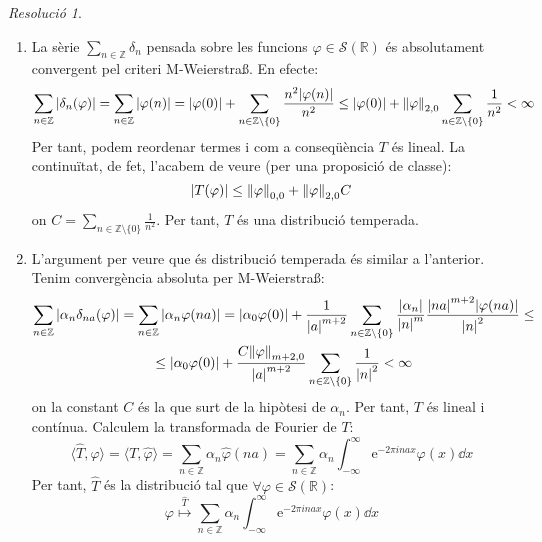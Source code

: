 \documentclass[10pt,a4paper]{article}
\newcommand{\ZZ}{\ensuremath{\mathbb{Z}}} %
\newcommand{\RR}{\ensuremath{\mathbb{R}}} %
\theoremstyle{definition}
\theoremstyle{remark}
\newtheorem*{res}{Resolució}
\renewcommand{\exp}[1]{\mathrm{e}^{#1}} %
\begin{document}
\begin{res}\hfill
  \begin{enumerate}
    \item La sèrie $\sum_{n\in\ZZ}\delta_n$ pensada sobre les funcions $\varphi\in\mathcal{S}(\RR)$ és absolutament convergent pel criteri M-Weierstra\ss. En efecte:
          $$
            \sum_{n\in\ZZ}\abs{\delta_n(\varphi)}=\sum_{n\in\ZZ}\abs{\varphi(n)}=\abs{\varphi(0)}+\sum_{n\in\ZZ\setminus\{0\}}\frac{n^2\abs{\varphi(n)}}{n^2}\leq \abs{\varphi(0)}+\norm{\varphi}_{2,0}\sum_{n\in\ZZ\setminus\{0\}}\frac{1}{n^2}<\infty
          $$
          Per tant, podem reordenar termes i com a conseqüència $T$ és lineal. La continuïtat, de fet, l'acabem de veure (per una proposició de classe):
          $$
            \abs{T(\varphi)}\leq \norm{\varphi}_{0,0}+\norm{\varphi}_{2,0}C
          $$
          on $C=\sum_{n\in\ZZ\setminus\{0\}}\frac{1}{n^2}$. Per tant, $T$ és una distribució temperada.
    \item L'argument per veure que és distribució temperada és similar a l'anterior. Tenim convergència absoluta per M-Weierstra\ss:
          \begin{multline*}
            \sum_{n\in\ZZ}\abs{\alpha_n\delta_{na}(\varphi)}=\sum_{n\in\ZZ}\abs{\alpha_n\varphi(na)}=\abs{\alpha_0\varphi(0)}+\frac{1}{\abs{a}^{m+2}}\sum_{n\in\ZZ\setminus\{0\}}\frac{\abs{\alpha_n}}{\abs{n}^m}\frac{\abs{na}^{m+2}\abs{\varphi(na)}}{\abs{n}^2}\leq \\
            \leq\abs{\alpha_0\varphi(0)}+\frac{C\norm{\varphi}_{m+2,0}}{\abs{a}^{m+2}}\sum_{n\in\ZZ\setminus\{0\}} \frac{1}{\abs{n}^2}<\infty
          \end{multline*}
          on la constant $C$ és la que surt de la hipòtesi de $\alpha_n$. Per tant, $T$ és lineal i contínua.
          Calculem la transformada de Fourier de $T$:
          $$
            \langle\widehat{T},\varphi\rangle=\langle T,\widehat{\varphi}\rangle=\sum_{n\in\ZZ}\alpha_n\widehat{\varphi}(na)=\sum_{n\in\ZZ}\alpha_n\int_{-\infty}^\infty\exp{-2\pi i na x}\varphi(x)\dd{x}
          $$
          Per tant, $\widehat{T}$ és la distribució tal que $\forall\varphi\in \mathcal{S}(\RR)$:
          $$
            \varphi\overset{\widehat{T}}\longmapsto \sum_{n\in\ZZ}\alpha_n\int_{-\infty}^\infty\exp{-2\pi i na x}\varphi(x)\dd{x}
          $$
  \end{enumerate}
\end{res}
\end{document}
